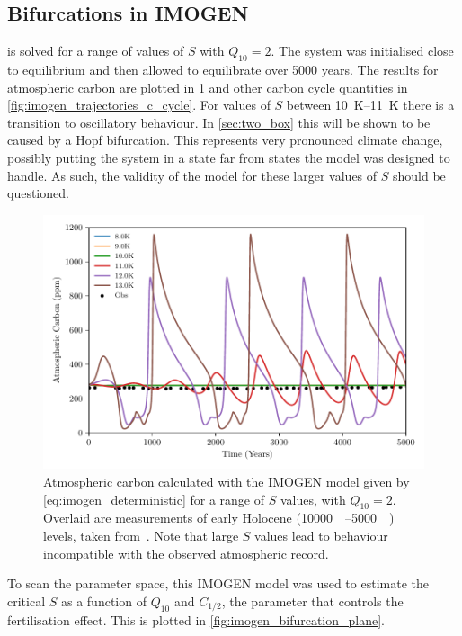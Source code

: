 \subsection{Bifurcations in IMOGEN}
 is solved for a range of values of $S$ with $Q_{10} = 2$. The system was initialised close to equilibrium and then allowed to equilibrate over 5000 years.
The results for atmospheric carbon are plotted in \cref{fig:imogen_trajectories} and other carbon cycle quantities in \cref{fig:imogen_trajectories_c_cycle}.
For values of $S$ between \SIrange{10}{11}{\kelvin} there is a
transition to oscillatory behaviour. In \cref{sec:two_box} this will be shown to be caused by a Hopf bifurcation. This represents very pronounced climate change, possibly putting
the system in a state far from states the model was designed to handle. As such, the validity of the model for these larger values of $S$ should be questioned.
\begin{figure}
  \centering
  \includegraphics[width=\textwidth,keepaspectratio]{imogen_traj}
  \caption[Using IMOGEN to find the behaviour of atmospheric  for various values of $S$]{Atmospheric carbon calculated with the IMOGEN model
    given by \cref{eq:imogen_deterministic} for a range of $S$ values,
    with $Q_{10} = 2$. Overlaid are measurements of early Holocene (\SIrange{10000}{5000}{\year\beforepresent})  levels, taken from~\cite{Bereiter2015}.
  Note that large $S$ values lead to behaviour incompatible with the observed atmospheric  record.}
  \label{fig:imogen_trajectories}
\end{figure}

To scan the parameter space, this IMOGEN model was used to estimate the critical $S$ as a function of $Q_{10}$ and $C_{1/2}$,
the parameter that controls the  fertilisation effect. This is plotted in \cref{fig:imogen_bifurcation_plane}.

